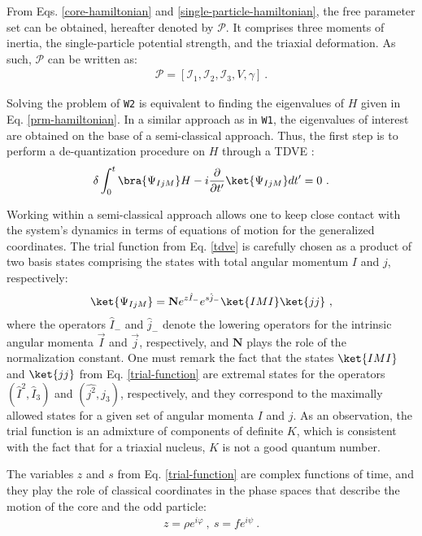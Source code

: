 \documentclass[myclassdoc,debug]{rjparticle}
\begin{document}
From Eqs. \ref{core-hamiltonian} and \ref{single-particle-hamiltonian}, the free parameter set can be obtained, hereafter denoted by $\mathcal{P}$. It comprises three moments of inertia, the single-particle potential strength, and the triaxial deformation. As such, $\mathcal{P}$ can be written as:
\begin{align}
    \mathcal{P}=\left[\mathcal{I}_1,\mathcal{I}_2,\mathcal{I}_3,V,\gamma\right]\ .
    \label{parameter-set}
\end{align}

Solving the problem of \texttt{W2} is equivalent to finding the eigenvalues of $H$ given in Eq. \ref{prm-hamiltonian}. In a similar approach as in \texttt{W1}, the eigenvalues of interest are obtained on the base of a semi-classical approach. Thus, the first step is to perform a de-quantization procedure on $H$ through a TDVE \cite{raduta2007semiclassical,budaca2018tilted,raduta2017semiclassical}:
\begin{align}
    \delta\int_0^t\bra{\Psi_{IjM}}H-i\frac{\partial}{\partial t'}\ket{\Psi_{IjM}}dt'=0\ .
    \label{tdve}
\end{align}

Working within a semi-classical approach allows one to keep close contact with the system's dynamics in terms of equations of motion for the generalized coordinates. The trial function from Eq. \ref{tdve} is carefully chosen as a product of two basis states comprising the states with total angular momentum $I$ and $j$, respectively:
\begin{align}
    \ket{\Psi_{IjM}}=\mathbf{N}e^{z\hat{I}_-}e^{s\hat{j}_-}\ket{IMI}\ket{jj}\ ,
    \label{trial-function}
\end{align}
where the operators $\hat{I}_-$ and $\hat{j}_-$ denote the lowering operators for the intrinsic angular momenta $\vec{I}$ and $\vec{j}$, respectively, and $\mathbf{N}$ plays the role of the normalization constant. One must remark the fact that the states $\ket{IMI}$ and $\ket{jj}$ from Eq. \ref{trial-function} are extremal states for the operators $(\hat{I}^2,\hat{I}_3)$ and $(\hat{j^2},\hat{j_3})$, respectively, and they correspond to the maximally allowed states for a given set of angular momenta $I$ and $j$. As an observation, the trial function is an admixture of components of definite $K$, which is consistent with the fact that for a triaxial nucleus, $K$ is not a good quantum number.

The variables $z$ and $s$ from Eq. \ref{trial-function} are complex functions of time, and they play the role of classical coordinates in the phase spaces that describe the motion of the core and the odd particle:
\begin{align}
    z=\rho e^{i\varphi}\ ,\ s=fe^{i\psi}\ .
    \label{complex-variable-set}
\end{align}
\end{document}
